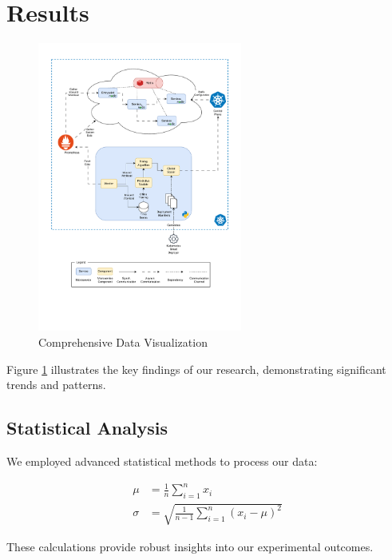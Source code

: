 \section{Results}
\begin{figure}[h]
    \centering
    \includegraphics[width=0.6\textwidth]{figures/testing-image.pdf}
    \caption{Comprehensive Data Visualization}
    \label{fig:results}
\end{figure}

Figure \ref{fig:results} illustrates the key findings of our research, demonstrating significant trends and patterns.

\subsection{Statistical Analysis}
We employed advanced statistical methods to process our data:

\begin{align*}
\mu &= \frac{1}{n} \sum_{i=1}^{n} x_i \\
\sigma &= \sqrt{\frac{1}{n-1} \sum_{i=1}^{n} (x_i - \mu)^2}
\end{align*}

These calculations provide robust insights into our experimental outcomes.